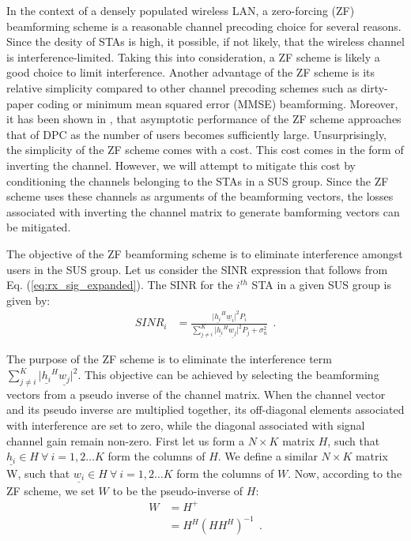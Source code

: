 In the context of a densely populated wireless LAN, a zero-forcing (ZF) beamforming scheme is a reasonable channel precoding choice for several reasons. Since the desity of STAs is high, it possible, if not likely, that the wireless channel is interference-limited. Taking this into consideration, a ZF scheme is likely a good choice to limit interference. Another advantage of the ZF scheme is its relative simplicity compared to other channel precoding schemes such as dirty-paper coding or minimum mean squared error (MMSE) beamforming. Moreover, it has been shown in \cite{Yoo2006}, \cite{Swannack2005} that asymptotic performance of the ZF scheme approaches that of DPC as the number of users becomes sufficiently large. Unsurprisingly, the simplicity of the ZF scheme comes with a cost. This cost comes in the form of inverting the channel. However, we will attempt to mitigate this cost by conditioning the channels belonging to the STAs in a SUS group. Since the ZF scheme uses these channels as arguments of the beamforming vectors, the losses associated with inverting the channel matrix to generate bamforming vectors can be mitigated.

The objective of the ZF beamforming scheme is to eliminate interference amongst users in the SUS group. Let us consider the  SINR expression that follows from Eq. (\ref{eq:rx_sig_expanded}). The SINR for the $i^{th}$ STA in a given SUS group is given by:
\begin{equation}\label{eq:sinr}
     \begin{aligned}
        SINR_i &= \frac{\vert \underline{h_i}^H \underline w_i \vert^2P_i}{ \sum_{j \neq i}^K \vert \underline{h_i}^H \underline{w_j}\vert^2 P_j +\sigma_n^2}\ \ .
     \end{aligned}
 \end{equation}
 
 The purpose of the ZF scheme is to eliminate the interference term  $\sum_{j \neq i}^K \vert \underline{h_i}^H \underline{w_j}\vert^2$. This objective can be achieved by selecting the beamforming vectors from a pseudo inverse of the channel matrix. When the channel vector and its pseudo inverse are multiplied together, its off-diagonal elements associated with interference are set to zero, while the diagonal associated with signal channel gain remain non-zero. First let us form a $N \times K$ matrix $H$, such that $\underline{h_i} \in H\ \forall\ i=1,2\ldots K$ form the columns of $H$. We define a similar $N \times K$ matrix W, such that $\underline{w_i} \in H\ \forall\ i=1,2\ldots K$ form the columns of $W$. Now, according to the ZF scheme, we set $W$ to be the pseudo-inverse of $H$:
 \begin{equation}\label{eq:zf_pseudo_inv}
     \begin{aligned}
        W &= H^+\\
        &= H^H(HH^H)^{-1}\ \ .
     \end{aligned}
 \end{equation}
 
